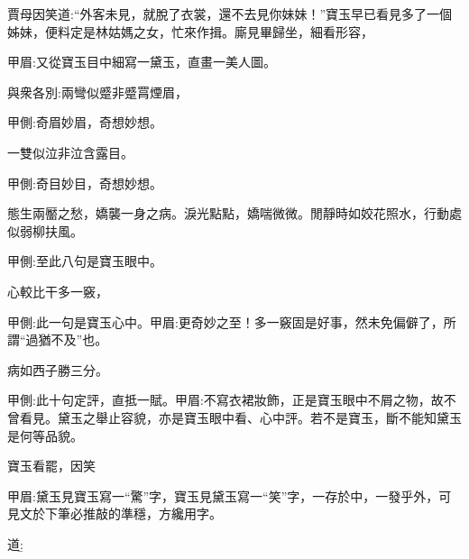 \begin{parag}
    賈母因笑道:“外客未見，就脫了衣裳，還不去見你妹妹！”寶玉早已看見多了一個姊妹，便料定是林姑媽之女，忙來作揖。廝見畢歸坐，細看形容，\begin{note}甲眉:又從寶玉目中細寫一黛玉，直畫一美人圖。\end{note}與衆各別:兩彎似蹙非蹙罥煙眉，\begin{note}甲側:奇眉妙眉，奇想妙想。\end{note}一雙似泣非泣含露目。\begin{note}甲側:奇目妙目，奇想妙想。\end{note}態生兩靨之愁，嬌襲一身之病。淚光點點，嬌喘微微。閒靜時如姣花照水，行動處似弱柳扶風。\begin{note}甲側:至此八句是寶玉眼中。\end{note}心較比干多一竅，\begin{note}甲側:此一句是寶玉心中。甲眉:更奇妙之至！多一竅固是好事，然未免偏僻了，所謂“過猶不及”也。\end{note}病如西子勝三分。\begin{note}甲側:此十句定評，直抵一賦。甲眉:不寫衣裙妝飾，正是寶玉眼中不屑之物，故不曾看見。黛玉之舉止容貌，亦是寶玉眼中看、心中評。若不是寶玉，斷不能知黛玉是何等品貌。\end{note}寶玉看罷，因笑\begin{note}甲眉:黛玉見寶玉寫一“驚”字，寶玉見黛玉寫一“笑”字，一存於中，一發乎外，可見文於下筆必推敲的準穩，方纔用字。\end{note}道:\b
\end{parag}
